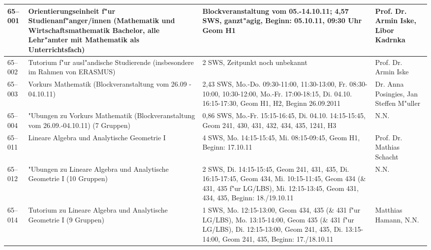 \begin{tabularx}{\textwidth}{|l|X|X|X|}
\hline 65--001 	& Orientierungseinheit f"ur Studienanf"anger/innen (Mathematik und Wirtschaftsmathematik Bachelor, alle Lehr"amter mit Mathematik als Unterrichtsfach)               
								& Block\-ver\-an\-stal\-tung vom 05.-14.10.11; 4,57 SWS, ganzt"agig, Beginn: 05.10.11, 09:30 Uhr Geom H1               
								& Prof. Dr. Armin Iske, Libor Kadrnka \\
\hline 65--002 	& Tutorium f"ur ausl"andische Studierende (insbesondere im Rahmen von ERASMUS)               
								& 2 SWS, Zeitpunkt noch unbekannt
								& Prof. Dr. Armin Iske \\
								
\hline 65--003 	& Vorkurs Mathematik (Blockveranstaltung vom 26.09 - 04.10.11)
           			& 2,43 SWS, Mo.-Do. 09:30-11:00, 11:30-13:00, Fr. 08:30-10:00, 10:30-12:00, Mo.-Fr. 17:00-18:15, Di. 04.10. 16:15-17:30, Geom H1, H2, Beginn 26.09.2011
								& Dr. Anna Posingies, Jan Steffen M"uller \\
								
\hline 65--004 	& "Ubungen zu Vorkurs Mathematik (Blockveranstaltung vom 26.09.-04.10.11) (7 Gruppen)
								& 0,86 SWS, Mo.-Fr. 15:15-16:45, Di. 04.10. 14:15-15:45, Geom 241, 430, 431, 432, 434, 435, 1241, H3
								& N.N. \\
\hhline{|=|=|=|=|} 65--011 & Lineare Algebra und Analytische Geometrie I
	                         & 4 SWS, Mo. 14:15-15:45, Mi. 08:15-09:45, Geom H1, Beginn: 17.10.11
	                         & Prof. Dr. Mathias Schacht \\
								
\hline 65--012 	& "Ubungen zu Lineare Algebra und Analytische Geometrie I (10 Gruppen)
								& 2 SWS, Di. 14:15-15:45, Geom 241, 431, 435, Di. 16:15-17:45, Geom 434, Mi. 10:15-11:45, Geom 434 (\& 431, 435 f"ur LG/LBS), Mi. 12:15-13:45, Geom 431, 434, 435, Beginn: 18./19.10.11
								& N.N. \\
								
\hline 65--014 	& Tutorium zu Lineare Algebra und Analytische Geometrie I (9 Gruppen)
								& 1 SWS, Mo. 12:15-13:00, Geom 434, 435 (\& 431 f"ur LG/LBS), Mo. 13:15-14:00, Geom 435 (\& 431 f"ur LG/LBS), Di. 12:15-13:00, Geom 241, 435, Di. 13:15-14:00, Geom 241, 435, Beginn: 17./18.10.11
								& Matthias Hamann, N.N. \\
								

\end{tabularx}
